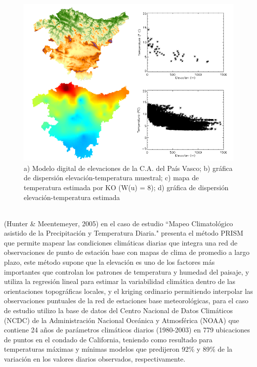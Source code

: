 \begin{figure}
    \centering
    \includegraphics[scale=0.4]{proyectos/proyecto_geoestadistica_croacia/images/ea_hernan_mp.png}
    \caption{ a) Modelo digital de elevaciones de la C.A. del País Vasco; b) gráfica de dispersión elevación-temperatura muestral; c) mapa de temperatura estimada por KO (W(u) = 8); d) gráfica de dispersión elevación-temperatura estimada}
    \label{ea_hernan}
\end{figure}
\\
 (Hunter & Meentemeyer, 2005) \cite{ea_hunter}  en el caso de estudio ``Mapeo Climatológico asistido de la Precipitación y Temperatura Diaria." presenta el método PRISM que permite mapear las condiciones climáticas diarias que integra una red de observaciones de punto de estación base con mapas de clima de promedio a largo plazo, este método supone que la elevación es uno de los factores más importantes que controlan los patrones de temperatura y humedad del paisaje, y utiliza la regresión lineal para estimar la variabilidad climática dentro de las orientaciones topográficas locales, y el kriging ordinario permitiendo interpolar las observaciones puntuales de la red de estaciones base meteorológicas, para el caso de estudio utilizo  la base de datos del Centro Nacional de Datos Climáticos (NCDC) de la Administración Nacional Oceánica y Atmosférica (NOAA) que contiene 24 años de parámetros climáticos diarios (1980-2003) en 779 ubicaciones de puntos en el condado de California, teniendo como resultado para temperaturas máximas y mínimas modelos que predijeron 92\% y 89\% de la variación en los valores diarios observados, respectivamente.



